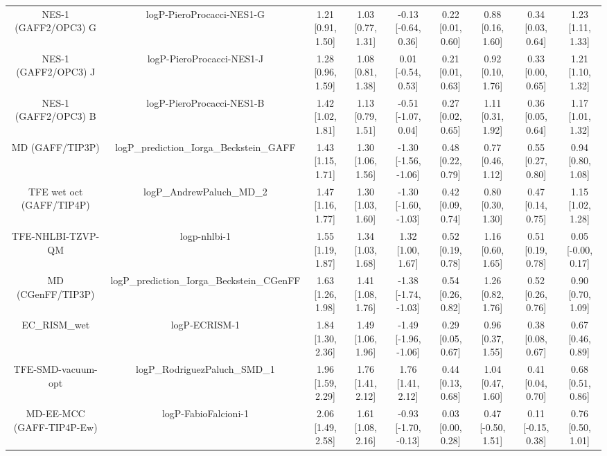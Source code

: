 \documentclass{article}
\begin{document}
\begin{center}
\begin{longtable}{|ccccccccc|}
         NES-1 (GAFF2/OPC3) G &                      logP-PieroProcacci-NES1-G &  1.21 [0.91, 1.50] &  1.03 [0.77, 1.31] &   -0.13 [-0.64, 0.36] &  0.22 [0.01, 0.60] &     0.88 [0.16, 1.60] &     0.34 [0.03, 0.64] &     1.23 [1.11, 1.33] \\
         NES-1 (GAFF2/OPC3) J &                      logP-PieroProcacci-NES1-J &  1.28 [0.96, 1.59] &  1.08 [0.81, 1.38] &    0.01 [-0.54, 0.53] &  0.21 [0.01, 0.63] &     0.92 [0.10, 1.76] &     0.33 [0.00, 0.65] &     1.21 [1.10, 1.32] \\
         NES-1 (GAFF2/OPC3) B &                      logP-PieroProcacci-NES1-B &  1.42 [1.02, 1.81] &  1.13 [0.79, 1.51] &   -0.51 [-1.07, 0.04] &  0.27 [0.02, 0.65] &     1.11 [0.31, 1.92] &     0.36 [0.05, 0.64] &     1.17 [1.01, 1.32] \\
              MD (GAFF/TIP3P) &       logP\_prediction\_Iorga\_Beckstein\_GAFF &  1.43 [1.15, 1.71] &  1.30 [1.06, 1.56] &  -1.30 [-1.56, -1.06] &  0.48 [0.22, 0.79] &     0.77 [0.46, 1.12] &     0.55 [0.27, 0.80] &     0.94 [0.80, 1.08] \\
     TFE wet oct (GAFF/TIP4P) &                      logP\_AndrewPaluch\_MD\_2 &  1.47 [1.16, 1.77] &  1.30 [1.03, 1.60] &  -1.30 [-1.60, -1.03] &  0.42 [0.09, 0.74] &     0.80 [0.30, 1.30] &     0.47 [0.14, 0.75] &     1.15 [1.02, 1.28] \\
            TFE-NHLBI-TZVP-QM &                                   logp-nhlbi-1 &  1.55 [1.19, 1.87] &  1.34 [1.03, 1.68] &     1.32 [1.00, 1.67] &  0.52 [0.19, 0.78] &     1.16 [0.60, 1.65] &     0.51 [0.19, 0.78] &    0.05 [-0.00, 0.17] \\
            MD (CGenFF/TIP3P) &     logP\_prediction\_Iorga\_Beckstein\_CGenFF &  1.63 [1.26, 1.98] &  1.41 [1.08, 1.76] &  -1.38 [-1.74, -1.03] &  0.54 [0.26, 0.82] &     1.26 [0.82, 1.76] &     0.52 [0.26, 0.76] &     0.90 [0.70, 1.09] \\
                  EC_RISM_wet &                                  logP-ECRISM-1 &  1.84 [1.30, 2.36] &  1.49 [1.06, 1.96] &  -1.49 [-1.96, -1.06] &  0.29 [0.05, 0.67] &     0.96 [0.37, 1.55] &     0.38 [0.08, 0.67] &     0.67 [0.46, 0.89] \\
           TFE-SMD-vacuum-opt &                  logP\_RodriguezPaluch\_SMD\_1 &  1.96 [1.59, 2.29] &  1.76 [1.41, 2.12] &     1.76 [1.41, 2.12] &  0.44 [0.13, 0.68] &     1.04 [0.47, 1.60] &     0.41 [0.04, 0.70] &     0.68 [0.51, 0.86] \\
    MD-EE-MCC (GAFF-TIP4P-Ew) &                           logP-FabioFalcioni-1 &  2.06 [1.49, 2.58] &  1.61 [1.08, 2.16] &  -0.93 [-1.70, -0.13] &  0.03 [0.00, 0.28] &    0.47 [-0.50, 1.51] &    0.11 [-0.15, 0.38] &     0.76 [0.50, 1.01] \\

\end{longtable}
\end{center}
\end{document}
